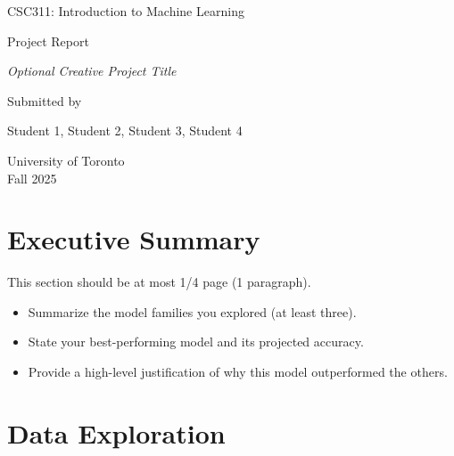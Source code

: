 \documentclass[12pt]{article}
\begin{document}
\begin{titlepage}
    \centering
    \vspace*{3cm}

    {\Large {CSC311: Introduction to Machine Learning} \par}
    \vspace{1cm}
    
    {\Large {Project Report} \par}
    \vspace{1cm}
    
    {\large \textit{Optional Creative Project Title} \par}
    \vspace{3cm}
    
    {\large Submitted by \par}
    \vspace{0.5cm}
    {\large Student 1, Student 2, Student 3, Student 4 \par}
    
    \vfill
    {\large University of Toronto \\ Fall 2025 \par}
\end{titlepage}
\clearpage
\setcounter{page}{1}

\section{Executive Summary}

This section should be at most 1/4 page (1 paragraph).

\begin{itemize}
  \item Summarize the model families you explored (at least three).  
  \item State your best-performing model and its projected accuracy.  
  \item Provide a high-level justification of why this model outperformed the others.  
\end{itemize}

\section{Data Exploration} 
\end{document}
